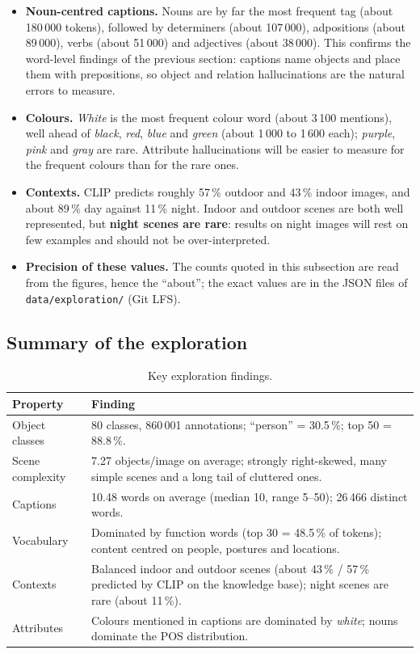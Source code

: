 \documentclass[11pt,a4paper]{article}
\renewcommand{\_}{\textunderscore\allowbreak{}}
\newcommand{\code}[1]{\texttt{#1}}
\begin{document}
\begin{interp}
\begin{itemize}[nosep]
  \item \textbf{Noun-centred captions.} Nouns are by far the most frequent tag (about 180\,000 tokens), followed by determiners (about 107\,000), adpositions (about 89\,000), verbs (about 51\,000) and adjectives (about 38\,000). This confirms the word-level findings of the previous section: captions name objects and place them with prepositions, so object and relation hallucinations are the natural errors to measure.
  \item \textbf{Colours.} \emph{White} is the most frequent colour word (about 3\,100 mentions), well ahead of \emph{black}, \emph{red}, \emph{blue} and \emph{green} (about 1\,000 to 1\,600 each); \emph{purple}, \emph{pink} and \emph{gray} are rare. Attribute hallucinations will be easier to measure for the frequent colours than for the rare ones.
  \item \textbf{Contexts.} CLIP predicts roughly 57\,\% outdoor and 43\,\% indoor images, and about 89\,\% day against 11\,\% night. Indoor and outdoor scenes are both well represented, but \textbf{night scenes are rare}: results on night images will rest on few examples and should not be over-interpreted.
  \item \textbf{Precision of these values.} The counts quoted in this subsection are read from the figures, hence the ``about''; the exact values are in the JSON files of \code{data/exploration/} (Git LFS).
\end{itemize}
\end{interp}

\subsection{Summary of the exploration}
\begin{table}[H]
\centering
\begin{tabular}{@{}p{5.2cm}p{9.5cm}@{}}
\toprule
\textbf{Property} & \textbf{Finding}\\
\midrule
Object classes & 80 classes, 860\,001 annotations; ``person'' = 30.5\,\%; top 50 = 88.8\,\%.\\
Scene complexity & 7.27 objects/image on average; strongly right-skewed, many simple scenes and a long tail of cluttered ones.\\
Captions & 10.48 words on average (median 10, range 5--50); 26\,466 distinct words.\\
Vocabulary & Dominated by function words (top 30 = 48.5\,\% of tokens); content centred on people, postures and locations.\\
Contexts & Balanced indoor and outdoor scenes (about 43\,\% / 57\,\% predicted by CLIP on the knowledge base); night scenes are rare (about 11\,\%).\\
Attributes & Colours mentioned in captions are dominated by \emph{white}; nouns dominate the POS distribution.\\
\bottomrule
\end{tabular}
\caption{Key exploration findings.}
\end{table}
\end{document}
